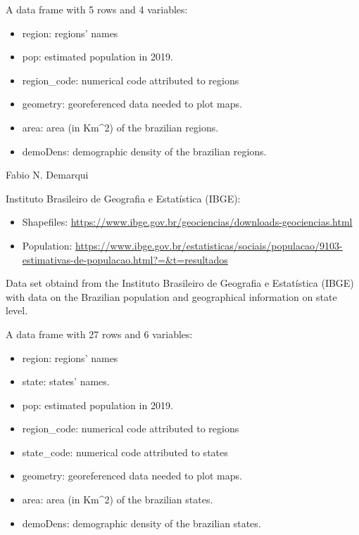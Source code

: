 \documentclass[letterpaper]{book}
\begin{document}
%
\begin{Format}
A data frame with 5 rows and 4 variables:
\begin{itemize}

\item{} region: regions' names
\item{} pop: estimated population in 2019.
\item{} region\_code: numerical code attributed to regions
\item{} geometry: georeferenced data needed to plot maps.
\item{} area: area (in Km\textasciicircum{}2) of the brazilian regions.
\item{} demoDens: demographic density of the brazilian regions.

\end{itemize}

\end{Format}
%
\begin{Author}\relax
Fabio N. Demarqui 
\end{Author}
%
\begin{Source}\relax
Instituto Brasileiro de Geografia e Estatística (IBGE):
\begin{itemize}

\item{} Shapefiles: \url{https://www.ibge.gov.br/geociencias/downloads-geociencias.html}
\item{} Population: \url{https://www.ibge.gov.br/estatisticas/sociais/populacao/9103-estimativas-de-populacao.html?=&t=resultados}

\end{itemize}

\end{Source}
%
\begin{Description}\relax
Data set obtaind from the Instituto Brasileiro de Geografia e Estatística (IBGE) with data on the Brazilian population and geographical information on state level.
\end{Description}
%
\begin{Format}
A data frame with 27 rows and 6 variables:
\begin{itemize}

\item{} region: regions' names
\item{} state: states' names.
\item{} pop: estimated population in 2019.
\item{} region\_code: numerical code attributed to regions
\item{} state\_code: numerical code attributed to states
\item{} geometry: georeferenced data needed to plot maps.
\item{} area: area (in Km\textasciicircum{}2) of the brazilian states.
\item{} demoDens: demographic density of the brazilian states.

\end{itemize}

\end{Format}
\end{document}
